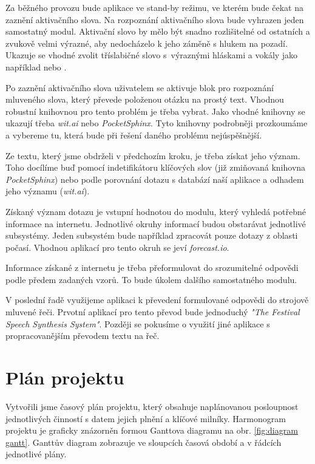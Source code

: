 \documentclass[12pt,a4paper]{article}
\begin{document}
Za běžného provozu bude aplikace ve stand-by režimu, ve kterém bude čekat na zaznění aktivačního slova. Na rozpoznání aktivačního slova bude vyhrazen jeden samostatný modul. Aktivační slovo by mělo být snadno rozlišitelné od ostatních a zvukově velmi výrazné, aby nedocházelo k jeho záměně s hlukem na pozadí. Ukazuje se vhodné zvolit tříslabičné slovo s~výraznými hláskami a vokály jako například  nebo .

Po zaznění aktivačního slova uživatelem se aktivuje blok pro rozpoznání mluveného slova, který převede položenou otázku na prostý text. Vhodnou robustní knihovnou pro tento problém je třeba vybrat. Jako vhodné knihovny se ukazují třeba \textit{wit.ai} nebo \textit{PocketSphinx}. Tyto knihovny podrobněji prozkoumáme a vybereme tu, která bude při řešení daného problému nejúspěšnější.

Ze textu, který jsme obdrželi v předchozím kroku, je třeba získat jeho význam. Toho docílíme buď pomocí indetifikátoru klíčových slov (již zmiňovaná knihovna \textit{PocketSphinx}) nebo podle porovnání dotazu s databází naší aplikace a odhadem jeho významu (\textit{wit.ai}).

Získaný význam dotazu je vstupní hodnotou do modulu, který vyhledá potřebné informace na internetu. Jednotlivé okruhy informací budou obstarávat jednotlivé subsystémy. Jeden subsystém bude například zpracovát pouze dotazy z oblasti počasí. Vhodnou aplikací pro tento okruh se jeví \textit{forecast.io}.

Informace získané z internetu je třeba přeformulovat do srozumitelné odpovědi podle předem zadaných vzorů. To bude úkolem dalšího samostatného modulu.

V poslední řadě využijeme aplikaci k převedení formulované odpovědi do strojově mluvené řeči. Prvotní aplikací pro tento převod bude jednoduchý \textit{"The Festival Speech Synthesis System"}. Později se pokusíme o využití jiné aplikace s propracovanějším převodem textu na řeč.


\section*{Plán projektu}
Vytvořili jsme časový plán projektu, který obsahuje naplánovanou posloupnost jednotlivých činností s datem jejich plnění a klíčové milníky. Harmonogram projektu je graficky znázorněn formou Ganttova diagramu na obr. \ref{fig:diagram gantt}. Ganttův diagram zobrazuje ve sloupcích časová období a v řádcích jednotlivé plány.
\end{document}
